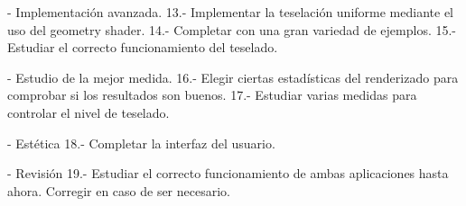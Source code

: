 - Implementación avanzada.
13.- Implementar la teselación uniforme mediante el uso del geometry shader.
14.- Completar con una gran variedad de ejemplos.
15.- Estudiar el correcto funcionamiento del teselado.

- Estudio de la mejor medida.
16.- Elegir ciertas estadísticas del renderizado para comprobar si los resultados son buenos.
17.- Estudiar varias medidas para controlar el nivel de teselado.

- Estética
18.- Completar la interfaz del usuario.

- Revisión
19.- Estudiar el correcto funcionamiento de ambas aplicaciones hasta ahora. Corregir en caso de ser necesario.

\endinput
